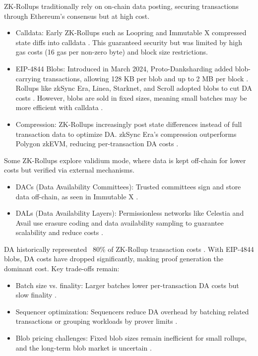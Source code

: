 
ZK-Rollups traditionally rely on on-chain data posting, securing transactions through Ethereum’s consensus but at high cost.
\vspace{12pt}

\begin{itemize}
\item Calldata: Early ZK-Rollups such as Loopring and Immutable X compressed state diffs into calldata \cite{gogol2025scalingdefi}. This guaranteed security but was limited by high gas costs (16 gas per non-zero byte) and block size restrictions.
\item EIP-4844 Blobs: Introduced in March 2024, Proto-Danksharding added blob-carrying transactions, allowing 128 KB per blob and up to 2 MB per block \cite{gogol2025scalingdefi}. Rollups like zkSync Era, Linea, Starknet, and Scroll adopted blobs to cut DA costs \cite{gogol2025scalingdefi}. However, blobs are sold in fixed sizes, meaning small batches may be more efficient with calldata \cite{gogol2025scalingdefi}.
\item Compression: ZK-Rollups increasingly post state differences instead of full transaction data to optimize DA. zkSync Era’s compression outperforms Polygon zkEVM, reducing per-transaction DA costs \cite{gogol2025scalingdefi}.
\end{itemize}

Some ZK-Rollups explore validium mode, where data is kept off-chain for lower costs but verified via external mechanisms.
\vspace{12pt}
\begin{itemize}
\item DACs (Data Availability Committees): Trusted committees sign and store data off-chain, as seen in Immutable X \cite{gogol2025scalingdefi}.
\item DALs (Data Availability Layers): Permissionless networks like Celestia and Avail use erasure coding and data availability sampling to guarantee scalability and reduce costs \cite{celestia_how}.
\end{itemize}

DA historically represented ~80\% of ZK-Rollup transaction costs \cite{stephan2025crowdprove}. With EIP-4844 blobs, DA costs have dropped significantly, making proof generation the dominant cost. Key trade-offs remain:
\vspace{12pt}
\begin{itemize}
\item Batch size vs. finality: Larger batches lower per-transaction DA costs but slow finality \cite{chaliasos2024analyzing}.
\item Sequencer optimization: Sequencers reduce DA overhead by batching related transactions or grouping workloads by prover limits \cite{chaliasos2024analyzing}.
\item Blob pricing challenges: Fixed blob sizes remain inefficient for small rollups, and the long-term blob market is uncertain \cite{gogol2025scalingdefi}.
\end{itemize}


